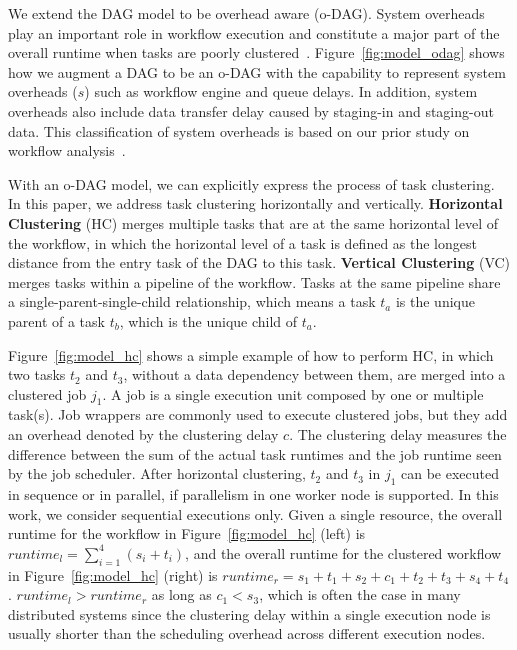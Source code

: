 \documentclass{IOS-Book-Article}
\begin{document}
We extend the DAG model to be overhead aware (o-DAG). System overheads play an important role in workflow execution and constitute a major part of the overall runtime when tasks are poorly clustered~\cite{Chen2011}. Figure~\ref{fig:model_odag} shows how we augment a DAG to be an o-DAG with the capability to represent system overheads ($s$) such as workflow engine and queue delays. In addition, system overheads also include data transfer delay caused by staging-in and staging-out data. This classification of system overheads is based on our prior study on workflow analysis~\cite{Chen2011}. 

With an o-DAG model, we can explicitly express the process of task clustering. In this paper, we address task clustering horizontally and vertically. \textbf{Horizontal Clustering} (HC) merges multiple tasks that are at the same horizontal level of the workflow, in which the horizontal level of a task is defined as the longest distance from the entry task of the DAG to this task. \textbf{Vertical Clustering} (VC) merges tasks within a pipeline of the workflow. Tasks at the same pipeline share a single-parent-single-child relationship, which means a task $t_a$ is the unique parent of a task $t_b$, which is the unique child of $t_a$. 

Figure~\ref{fig:model_hc} shows a simple example of how to perform HC, in which two tasks $t_2$ and $t_3$, without a data dependency between them, are merged into a clustered job $j_1$. A job is a single execution unit composed by one or multiple task(s). Job wrappers are commonly used to execute clustered jobs, but they add an overhead denoted by the clustering delay $c$. The clustering delay measures the difference between the sum of the actual task runtimes and the job runtime seen by the job scheduler. 
After horizontal clustering, $t_2$ and $t_3$ in $j_1$ can be executed in sequence or in parallel, if parallelism in one worker node is supported. In this work, we consider sequential executions only. Given a single resource, the overall runtime for the workflow in Figure~\ref{fig:model_hc} (left) is $runtime_l= \sum_{i=1}^{4}(s_i+t_i)$, and the overall runtime for the clustered workflow in Figure~\ref{fig:model_hc} (right) is $runtime_r=s_1+t_1+s_2+c_1+t_2+t_3+s_4+t_4$.  $runtime_l > runtime_r$ as long as $c_1 < s_3$, which is often the case in many distributed systems since the clustering delay within a single execution node is usually shorter than the scheduling overhead across different execution nodes. 
\end{document}
